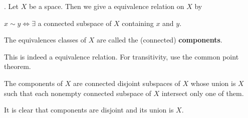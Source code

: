 
.  Let \(X\) be a space. Then we give a equivalence relation on \(X\) by
\begin{center}
    \(x \sim y \iff \exists\) a connected subspace of \(X\) containing \(x\) and \(y\).
\end{center}
The equivalences classes of \(X\) are called the (connected) \textbf{components}.

\rmk This is indeed a equivalence relation. For transitivity, use the common point theorem.

 The components of \(X\) are connected disjoint subspaces of \(X\) whose union is \(X\) such that each nonempty connected subspace of \(X\) intersect only one of them.

\pf It is clear that components are disjoint and its union is \(X\).

\pagebreak
